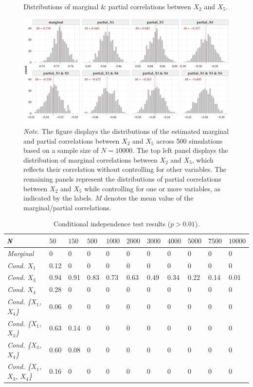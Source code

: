 \documentclass[twoside, 11pt]{article}
\begin{document}
\begin{appendices}
\begin{figure}[t]
    \centering
        \caption{Distributions of marginal \& partial correlations between $X_2$ and $X_5$.}
        \includegraphics[width=1\textwidth]{figures/partialcorr.pdf}
        \caption*{\small{\textit{Note.} The figure displays the distributions of the estimated marginal and partial correlations between $X_2$ and $X_5$ across 500 simulations based on a sample size of $N=10000$. The top left panel displays the distribution of marginal correlations between $X_2$ and $X_5$, which reflects their correlation without controlling for other variables. The remaining panels represent the distributions of partial correlations between $X_2$ and $X_5$ while controlling for one or more variables, as indicated by the labels. $M$ denotes the mean value of the marginal/partial correlations.}}
    \label{fig:F2}
\end{figure}

\begin{table}[H]
\caption{Conditional independence test results ($p > 0.01$).}
\label{tab:4}
\renewcommand{\arraystretch}{1}
\begin{tabularx}{\textwidth}{p{3cm}*{10}{X}}
\toprule
$\textit{\textbf{N }}$ & $\textit{50}$ & $\textit{150}$ & $\textit{500}$ & $\textit{1000}$ & $\textit{2000}$ & $\textit{3000}$ 
 & $\textit{4000}$ & $\textit{5000}$ & $\textit{7500}$ & $\textit{10000}$\\
\midrule
\textit{Marginal} & 0 & 0 & 0 & 0 & 0 & 0 & 0 & 0 & 0 & 0 \\
\textit{Cond. $X_1$} & 0.12 & 0 & 0 & 0 & 0 & 0 & 0 & 0 & 0 & 0 \\
\textit{Cond. $X_3$} & 0.94 & 0.91 & 0.83 & 0.73 & 0.63 & 0.49 & 0.34 & 0.22 & 0.14 &0.01\\
\textit{Cond.  $X_4$} & 0.28 & 0 & 0 & 0 & 0 & 0 & 0 & 0 & 0 & 0\\
\textit{Cond.  \{$X_1$, $X_4$\}}  & 0.06 & 0 & 0 & 0 & 0 & 0 & 0 & 0 & 0 & 0\\
\textit{Cond.  \{$X_1$, $X_3$\}} & 0.63 & 0.14 & 0 & 0 & 0 & 0 & 0 & 0 & 0 & 0\\
\textit{Cond. \{$X_3$, $X_4$\}} & 0.60 & 0.08 & 0 & 0 & 0 & 0 & 0 & 0 & 0 & 0\\
\textit{Cond.  \{$X_1$, $X_3$, $X_4$\}} & 0.16 & 0 & 0 & 0 & 0 & 0 & 0 & 0 & 0 & 0\\
\bottomrule
\end{tabularx}


\end{table}
\end{appendices}
\end{document}
